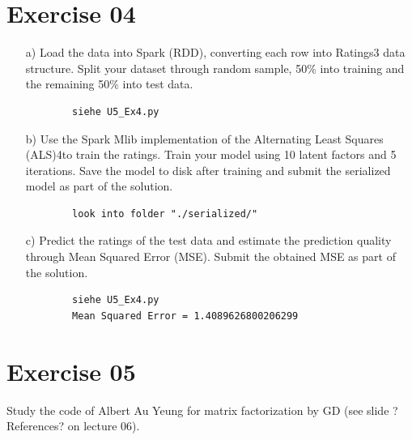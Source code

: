 \documentclass[11pt,a4paper]{scrartcl}
\begin{document}
\section*{Exercise 04}
	\begin{itemize}
	\item [a)] Load the data into Spark (RDD), converting each row into Ratings3 data structure. Split your dataset through random sample, 50\% into training and the remaining 50\% into test data.
	\begin{verbatim}
		siehe U5_Ex4.py
	\end{verbatim}	
	\item [b)] Use the Spark Mlib implementation of the Alternating Least Squares (ALS)4to train the ratings. Train your model using 10 latent factors and 5 iterations. Save the model to disk after training and submit the serialized model as part of the solution.
	\begin{verbatim}
		look into folder "./serialized/"
	\end{verbatim}	
	\item [c)] Predict the ratings of the test data and estimate the prediction quality through Mean Squared Error (MSE). Submit the obtained MSE as part of the solution.
	\begin{verbatim}
		siehe U5_Ex4.py
		Mean Squared Error = 1.4089626800206299
	\end{verbatim}	
\end{itemize}

\section*{Exercise 05}
Study the code of Albert Au Yeung for matrix factorization by GD (see slide ?References? on lecture 06).
\end{document}
